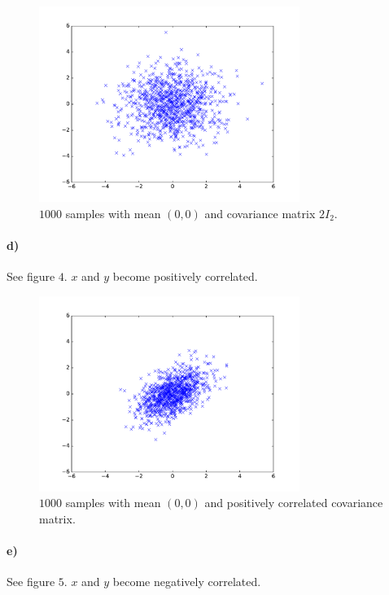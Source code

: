 \documentclass[12pt]{article}
\begin{document}
\begin{figure}[h!]
        \begin{center}
                \includegraphics[height=2.5in]{Problem10-c}
                \caption{\(1000\) samples with mean \((0,0)\) and covariance matrix \(2I_2\).}
        \end{center}
\end{figure}

\paragraph{d)} See figure \(4\). \(x\) and \(y\) become positively correlated.

\begin{figure}[H]
        \begin{center}
                \includegraphics[height=2.5in]{Problem10-d}
                \caption{\(1000\) samples with mean \((0,0)\) and positively correlated covariance matrix.}
        \end{center}
\end{figure}

\paragraph{e)} See figure \(5\). \(x\) and \(y\) become negatively correlated.
\end{document}
